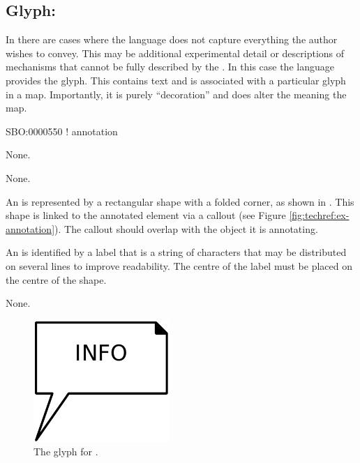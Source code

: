 \subsection{Glyph: }
\label{sec:annotation}

In \SBGNPDLone there are cases where the language does not capture everything the author wishes to convey.
This may be additional experimental detail or descriptions of mechanisms that cannot be fully described by the \PDl.
In this case the language provides the  glyph. This contains text and is associated with a particular glyph in a map.
Importantly, it is purely ``decoration'' and does alter the meaning the map.

\begin{glyphDescription}

\glyphSboTerm
SBO:0000550 ! annotation

\glyphIncoming
None.

\glyphOutgoing
None.

\glyphContainer
An  is represented by a rectangular shape with a folded corner, as shown in .
This shape is linked to the annotated element via a callout (see Figure \ref{fig:techref:ex-annotation}).
The callout should overlap with the object it is annotating.

\glyphLabel
An  is identified by a label that is  a string of characters that may be distributed on several lines to improve readability.
The centre of the label must be placed on the centre of the shape.

\glyphAux
None.

\end{glyphDescription}

\begin{figure}[htb]
  \centering
  \includegraphics{images/build/annotation.pdf}
  \caption{The \PD glyph for .}
  \label{fig:techref:annotation}
\end{figure}

